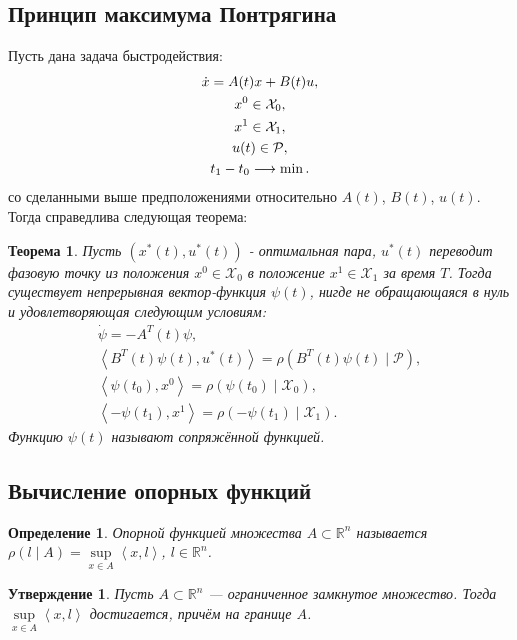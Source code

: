 \documentclass[11pt]{article}
\newtheorem{theorem}{Теорема}
\newtheorem{defenition}{Определение}
\newtheorem{proposition}{Утверждение}
\newcommand{\scalar}[2]{\left<#1,#2\right>}
\begin{document}
\subsection{Принцип максимума Понтрягина}
Пусть дана задача быстродействия:
\begin{gather}
\dot{x} = A(t)x + B(t)u, \notag \\
x^0 \in \mathcal{X}_0, \notag \\
x^1 \in \mathcal{X}_1, \notag \\
u(t) \in \mathcal{P}, \notag \\
t_1 - t_0 \longrightarrow \min. \notag
\end{gather}
со сделанными выше предположениями относительно $A(t)$, $B(t)$, $u(t)$. Тогда справедлива следующая теорема:
\begin{theorem} \label{PMP}
Пусть $\left( x^*(t), u^*(t) \right)$ - оптимальная пара, $u^*(t)$ переводит фазовую точку из положения $x^0 \in \mathcal{X}_0$ в положение $x^1 \in \mathcal{X}_1$ за время $T$. Тогда существует непрерывная вектор-функция $\psi(t)$, нигде не обращающаяся в нуль и удовлетворяющая следующим условиям:
\begin{gather}
\dot{\psi} = -A^T(t)\psi, \label{PMP2} \\
\scalar{B^T(t)\psi(t)}{u^*(t)} = \rho(B^T(t)\psi(t) \mid \mathcal{P}), \label{PMP3} \\
\scalar{\psi(t_0)}{x^0} = \rho(\psi(t_0) \mid \mathcal{X}_0), \label{PMP4} \\
\scalar{-\psi(t_1)}{x^1} = \rho(-\psi(t_1) \mid \mathcal{X}_1). \label{PMP5}
\end{gather}
Функцию $\psi(t)$ называют сопряжённой функцией.
\end{theorem}
\subsection{Вычисление опорных функций}
\begin{defenition}
Опорной функцией множества $A \subset \mathbb{R}^n$ называется $\rho(l \mid A) = \sup\limits_{x \in A} \scalar{x}{l}$, $l \in \mathbb{R}^n$.
\end{defenition}
\begin{proposition}
Пусть $A \subset \mathbb{R}^n$ --- ограниченное замкнутое множество. Тогда $\sup\limits_{x \in A} \scalar{x}{l}$ достигается, причём на границе $A$.
\end{proposition}
\end{document}
